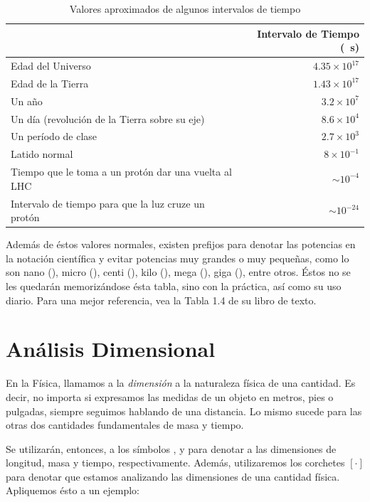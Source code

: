 \begin{table}[t]
\caption{Valores aproximados de algunos intervalos de tiempo}
\begin{tabular}{l r}
\toprule
           & \textbf{Intervalo de Tiempo (\SI{}{\second})} \\
\midrule
Edad del Universo & $4.35\times10^{17}$\\
Edad de la Tierra & $1.43\times10^{17}$\\
Un a\~no  &  $3.2\times10^{7}$  \\
Un d\'ia (revoluci\'on de la Tierra sobre su eje) &  $8.6\times10^{4}$ \\
Un per\'iodo de clase & $2.7\times10^{3}$\\
Latido normal & $8\times10^{-1}$\\
Tiempo que le toma a un prot\'on dar una vuelta al LHC & $\sim 10^{-4}$\\
Intervalo de tiempo para que la luz cruze un prot\'on & $\sim10^{-24}$\\
\bottomrule
\end{tabular}
\label{table:tiempos1}
\end{table}

Adem\'as de \'estos valores normales, existen prefijos para denotar las potencias en la notaci\'on cient\'ifica y evitar potencias muy grandes o muy peque\~nas, como lo son nano (\si{\nano}), micro (\si{\micro}), centi (\si{\centi}), kilo (\si{\kilo}), mega (\si{\mega}), giga (\si{\giga}), entre otros. \'Estos no se les quedar\'an memoriz\'andose \'esta tabla, sino con la pr\'actica, as\'i como su uso diario. Para una mejor referencia, vea la Tabla 1.4 de su libro de texto.


\section{An\'alisis Dimensional}\label{sec:analisisdim1}

En la F\'isica, llamamos a la \emph{dimensi\'on} a la naturaleza f\'isica de una cantidad. Es decir, no importa si expresamos las medidas de un objeto en metros, pies o pulgadas, siempre seguimos hablando de una distancia. Lo mismo sucede para las otras dos cantidades fundamentales de masa y tiempo. 

Se utilizar\'an, entonces, a los s\'imbolos \si{\length}, \si{\mass} y \si{\time} para denotar a las dimensiones de longitud, masa y tiempo, respectivamente. Adem\'as, utilizaremos los corchetes $[\cdot]$ para denotar que estamos analizando las dimensiones de una cantidad f\'isica. Apliquemos \'esto a un ejemplo:

